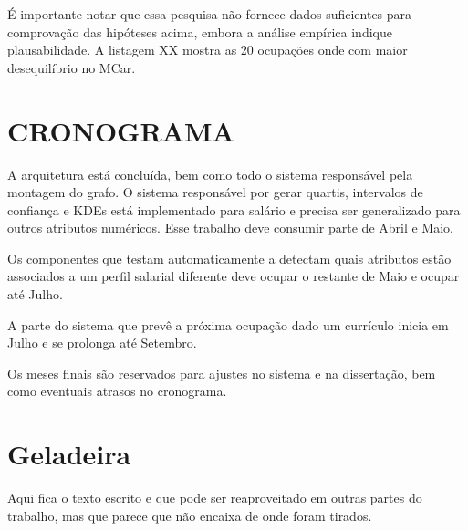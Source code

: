 \documentclass[12pt,a4paper]{article}
\theoremstyle{hypo}
\begin{document}
É importante notar que essa pesquisa não fornece dados suficientes para comprovação das hipóteses acima, embora a análise empírica indique plausabilidade. A listagem XX mostra as 20 ocupações onde com maior desequilíbrio no MCar.
\section{CRONOGRAMA}

A arquitetura está concluída, bem como todo o sistema responsável pela montagem do grafo. O sistema responsável por gerar quartis, intervalos de confiança e KDEs está implementado para salário e precisa ser generalizado para outros atributos numéricos. Esse trabalho deve consumir parte de Abril e Maio.

Os componentes que testam automaticamente a detectam quais atributos estão associados a um perfil salarial diferente deve ocupar o restante de Maio e ocupar até Julho.

A parte do sistema que prevê a próxima ocupação dado um currículo inicia em Julho e se prolonga até Setembro.

Os meses finais são reservados para ajustes no sistema e na dissertação, bem como eventuais atrasos no cronograma.


\section{Geladeira}

Aqui fica o texto escrito e que pode ser reaproveitado em outras partes do trabalho, mas que parece que não encaixa de onde foram tirados.
\end{document}
